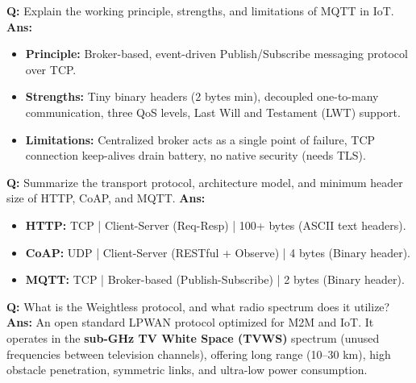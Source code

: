 \documentclass[10pt,a4paper,twocolumn]{article}
\begin{document}
\begin{tcolorbox}[
  colback=white,
  colframe=UnitColorThree,
  colbacktitle=gray!10!white,
  coltitle=black,
  fonttitle=\bfseries\sffamily\small,
  title={Unit III $\bullet$ Card 15},
  boxrule=1.2pt,
  arc=2mm,
  outer arc=2mm,
  boxsep=1.5mm,
  top=1mm,
  bottom=1mm,
  left=1.5mm,
  right=1.5mm,
  before skip=2.5mm,
  after skip=2.5mm
]
\textbf{Q:} Explain the working principle, strengths, and limitations of MQTT in IoT.
\tcbline
\textbf{Ans:} \begin{itemize}
  \item \textbf{Principle:} Broker-based, event-driven Publish/Subscribe messaging protocol over TCP.
  \item \textbf{Strengths:} Tiny binary headers (2 bytes min), decoupled one-to-many communication, three QoS levels, Last Will and Testament (LWT) support.
  \item \textbf{Limitations:} Centralized broker acts as a single point of failure, TCP connection keep-alives drain battery, no native security (needs TLS).
\end{itemize}
\end{tcolorbox}


\begin{tcolorbox}[
  colback=white,
  colframe=UnitColorThree,
  colbacktitle=gray!10!white,
  coltitle=black,
  fonttitle=\bfseries\sffamily\small,
  title={Unit III $\bullet$ Card 16},
  boxrule=1.2pt,
  arc=2mm,
  outer arc=2mm,
  boxsep=1.5mm,
  top=1mm,
  bottom=1mm,
  left=1.5mm,
  right=1.5mm,
  before skip=2.5mm,
  after skip=2.5mm
]
\textbf{Q:} Summarize the transport protocol, architecture model, and minimum header size of HTTP, CoAP, and MQTT.
\tcbline
\textbf{Ans:} \begin{itemize}
  \item \textbf{HTTP:} TCP | Client-Server (Req-Resp) | 100+ bytes (ASCII text headers).
  \item \textbf{CoAP:} UDP | Client-Server (RESTful + Observe) | 4 bytes (Binary header).
  \item \textbf{MQTT:} TCP | Broker-based (Publish-Subscribe) | 2 bytes (Binary header).
\end{itemize}
\end{tcolorbox}


\begin{tcolorbox}[
  colback=white,
  colframe=UnitColorThree,
  colbacktitle=gray!10!white,
  coltitle=black,
  fonttitle=\bfseries\sffamily\small,
  title={Unit III $\bullet$ Card 17},
  boxrule=1.2pt,
  arc=2mm,
  outer arc=2mm,
  boxsep=1.5mm,
  top=1mm,
  bottom=1mm,
  left=1.5mm,
  right=1.5mm,
  before skip=2.5mm,
  after skip=2.5mm
]
\textbf{Q:} What is the Weightless protocol, and what radio spectrum does it utilize?
\tcbline
\textbf{Ans:} An open standard LPWAN protocol optimized for M2M and IoT. It operates in the \textbf{sub-GHz TV White Space (TVWS)} spectrum (unused frequencies between television channels), offering long range (10–30 km), high obstacle penetration, symmetric links, and ultra-low power consumption.
\end{tcolorbox}
\end{document}
